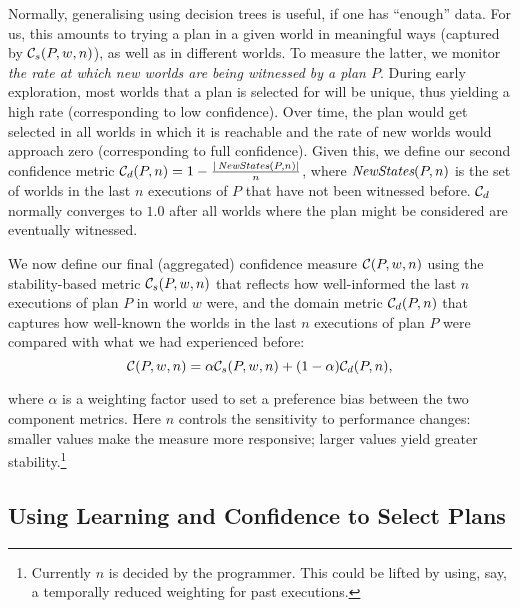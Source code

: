 \newcommand{\neww}{\mathname{NewStates}}
Normally, generalising using decision trees is useful, if one has ``enough'' data. For us, this amounts to trying a plan in a given world in meaningful ways (captured by ${\mathcal{C}}_s(P,w,n)$), as well as in different worlds. 
To measure the latter, we monitor \emph{the rate at which new worlds are being witnessed by a  plan $P$}. During early exploration, most worlds that a plan is selected for will be unique, thus yielding a high rate (corresponding to low confidence). Over time, the plan would get selected in all worlds in which it is reachable and the rate of new worlds would approach zero (corresponding to full confidence). Given this, we define our second confidence metric $\C_d(P,n) = 1 - \frac{|\neww(P,n)|}{n}$, where $\neww(P,n)$ is the set of worlds in the last $n$ executions of $P$ that have not been witnessed before. ${\mathcal{C}}_d$ normally converges to $1.0$ after all worlds where the plan might be considered are eventually witnessed.%

We now define our final (aggregated) confidence measure ${\mathcal{C}}(P,w,n)$ using the stability-based metric ${\mathcal{C}}_s(P,w,n)$ that reflects how well-informed the last $n$ executions of plan $P$ in world $w$ were, and the domain metric ${\mathcal{C}}_d(P,n)$ that captures how well-known the worlds in the last $n$ executions of plan $P$ were compared with what we had experienced before:
\[
	{\mathcal{C}}(P,w,n) = \alpha{\ensuremath{\mathcal{C}}}_s(P,w,n) + (1-\alpha){\mathcal{C}}_d(P,n),
\label{eqn:confidence}
\]

\noindent
where $\alpha$ is a weighting factor used to set a preference bias between the two component metrics.
%
Here $n$ controls the sensitivity to performance changes: smaller values make the measure more responsive; larger values yield greater stability.\footnote{Currently $n$ is decided by the programmer. This could be lifted by using, say, a temporally reduced weighting for past executions.}





\subsection{Using Learning and Confidence to Select Plans}\label{sec:selection}

\newcommand{\aSet}{\mathname{set}}
\newcommand{\aOperate}{\mathname{operate}}
\newcommand{\aEvaluate}{\mathname{evaluate}}

\newcommand{\pSet}{\mathname{Set*}}
\newcommand{\pSetCharge}{\mathname{SetCharge}}
\newcommand{\pSetDischarge}{\mathname{SetDischarge}}
\newcommand{\pSetNotUsed}{\mathname{SetNotUsed}}
\newcommand{\pExecute}{\mathname{Execute}}

